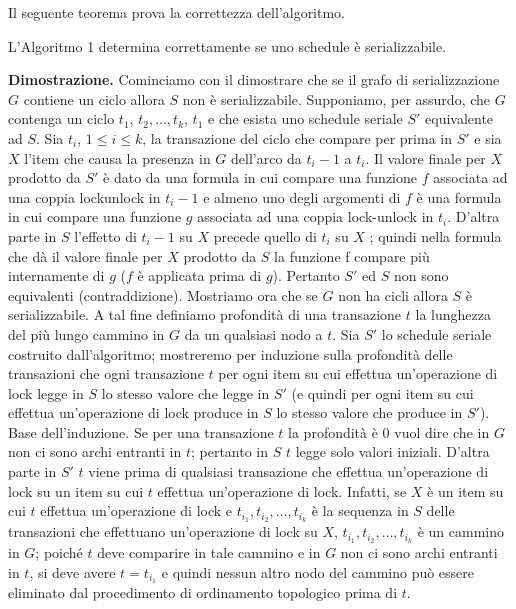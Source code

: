 \noindent Il seguente teorema prova la correttezza dell'algoritmo.
\label{teorema_6_1}
\begin{theo}
L'Algoritmo 1 determina correttamente se uno schedule è serializzabile. 
\end{theo}
\textbf{Dimostrazione.} Cominciamo con il dimostrare che se il grafo di serializzazione $G$ contiene un ciclo allora $S$
non è serializzabile. Supponiamo, per assurdo, che $G$ contenga un ciclo $t_1$, $t_2, \ldots, t_k$, $t_1$ e che
esista uno schedule seriale $S'$ equivalente ad $S$. Sia $t_i$, $1\leq i \leq k$, la transazione del ciclo che compare
per prima in $S'$ e sia $X$ l'item che causa la presenza in $G$ dell'arco da $t_i-1$ a $t_i$. Il valore finale per $X$
prodotto da $S'$ è dato da una formula in cui compare una funzione $f$ associata ad una coppia lockunlock
in $t_i-1$ e almeno uno degli argomenti di $f$ è una formula in cui compare una funzione $g$
associata ad una coppia lock-unlock in $t_i$. D'altra parte in $S$ l'effetto di $t_i-1$ su $X$ precede quello di $t_i$
su $X$ ; quindi nella formula che dà il valore finale per $X$ prodotto da $S$ la funzione f compare più
internamente di $g$ ($f$ è applicata prima di $g$). Pertanto $S'$ ed $S$ non sono equivalenti (contraddizione).
Mostriamo ora che se $G$ non ha cicli allora $S$ è serializzabile. A tal fine definiamo profondità di una
transazione $t$ la lunghezza del più lungo cammino in $G$ da un qualsiasi nodo a $t$.
Sia $S'$ lo schedule seriale costruito dall'algoritmo; mostreremo per induzione sulla profondità delle
transazioni che ogni transazione $t$ per ogni item su cui effettua un'operazione di lock legge in $S$ lo
stesso valore che legge in $S'$ (e quindi per ogni item su cui effettua un'operazione di lock produce in
$S$ lo stesso valore che produce in $S'$).
Base dell'induzione. Se per una transazione $t$ la profondità è 0 vuol dire che in $G$ non ci sono archi
entranti in $t$; pertanto in $S$ $t$ legge solo valori iniziali. D'altra parte in $S'$ $t$ viene prima di qualsiasi
transazione che effettua un'operazione di lock su un item su cui $t$ effettua un'operazione di lock.
Infatti, se $X$ è un item su cui $t$ effettua un'operazione di lock e $t_{i_1}, t_{i_2}, \ldots, t_{i_k}$ è la sequenza in $S$
delle transazioni che effettuano un'operazione di lock su $X$, $t_{i_1}, t_{i_2}, \ldots, t_{i_k}$ è un cammino in $G$;
poiché $t$ deve comparire in tale cammino e in $G$ non ci sono archi entranti in $t$, si deve avere $t=t_{i_1}$
e quindi nessun altro nodo del cammino può essere eliminato dal procedimento di ordinamento
topologico prima di $t$.
